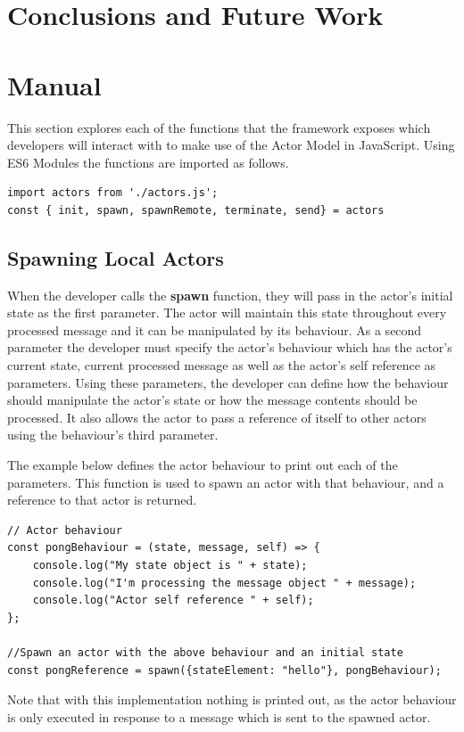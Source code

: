 \documentclass[12pt, a4paper]{report}
\theoremstyle{definition}
\theoremstyle{definition}%
\theoremstyle{definition}%
\theoremstyle{definition}%
\theoremstyle{definition}%
\theoremstyle{definition}%
\begin{document}
\chapter{Conclusions and Future Work}

\appendix
\chapter{Manual}
This section explores each of the functions that the framework exposes which developers will interact with to make use of the Actor Model in JavaScript. Using ES6 Modules the functions are imported as follows.
\begin{lstlisting}
import actors from './actors.js';
const { init, spawn, spawnRemote, terminate, send} = actors
\end{lstlisting}
\section{Spawning Local Actors}
When the developer calls the \textbf{spawn} function, they will pass in the actor's initial state as the first parameter. The actor will maintain this state throughout every processed message and it can be manipulated by its behaviour. As a second parameter the developer must specify the actor's behaviour which has the actor's current state, current processed message as well as the actor's self reference as parameters. Using these parameters, the developer can define how the behaviour should manipulate the actor's state or how the message contents should be processed. It also allows the actor to pass a reference of itself to other actors using the behaviour's third parameter.

The example below defines the actor behaviour to print out each of the parameters. This function is used to spawn an actor with that behaviour, and a reference to that actor is returned.
\begin{lstlisting}
// Actor behaviour
const pongBehaviour = (state, message, self) => {
    console.log("My state object is " + state);
    console.log("I'm processing the message object " + message);
    console.log("Actor self reference " + self);
};

//Spawn an actor with the above behaviour and an initial state
const pongReference = spawn({stateElement: "hello"}, pongBehaviour);
\end{lstlisting}
Note that with this implementation nothing is printed out, as the actor behaviour is only executed in response to a message which is sent to the spawned actor.
\end{document}
